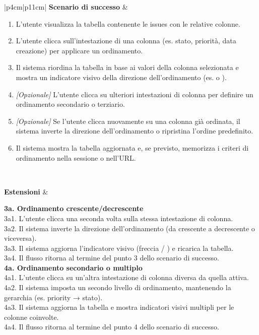\begin{longtable}{|p{4cm}|p{11cm}|}
\textbf{Scenario di successo} &
\begin{minipage}[t]{\linewidth}\raggedright
\begin{enumerate}[leftmargin=*,nosep]
\item L'utente visualizza la tabella contenente le issues con le relative colonne.
\item L'utente clicca sull'intestazione di una colonna (es. stato, priorità, data creazione) per applicare un ordinamento.
\item Il sistema riordina la tabella in base ai valori della colonna selezionata e mostra un indicatore visivo della direzione dell'ordinamento (es. \uparrow o \downarrow).
\item \textit{[Opzionale]} L'utente clicca su ulteriori intestazioni di colonna per definire un ordinamento secondario o terziario.
\item \textit{[Opzionale]} Se l'utente clicca nuovamente su una colonna già ordinata, il sistema inverte la direzione dell'ordinamento o ripristina l'ordine predefinito.
\item Il sistema mostra la tabella aggiornata e, se previsto, memorizza i criteri di ordinamento nella sessione o nell'URL.
\end{enumerate}
\end{minipage} \\ \hline

\textbf{Estensioni} &
\begin{minipage}[t]{\linewidth}\raggedright
\textbf{3a. Ordinamento crescente/decrescente}\\
3a1. L'utente clicca una seconda volta sulla stessa intestazione di colonna.\\
3a2. Il sistema inverte la direzione dell'ordinamento (da crescente a decrescente o viceversa).\\
3a3. Il sistema aggiorna l'indicatore visivo (freccia \uparrow/\downarrow \) ) e ricarica la tabella.\\
3a4. Il flusso ritorna al termine del punto 3 dello scenario di successo.\\[0.6em]

\textbf{4a. Ordinamento secondario o multiplo}\\
4a1. L'utente clicca su un'altra intestazione di colonna diversa da quella attiva.\\
4a2. Il sistema imposta un secondo livello di ordinamento, mantenendo la gerarchia (es. priority → stato).\\
4a3. Il sistema aggiorna la tabella e mostra indicatori visivi multipli per le colonne coinvolte.\\
4a4. Il flusso ritorna al termine del punto 4 dello scenario di successo.\\[0.6em]


\end{minipage}
\end{longtable}
